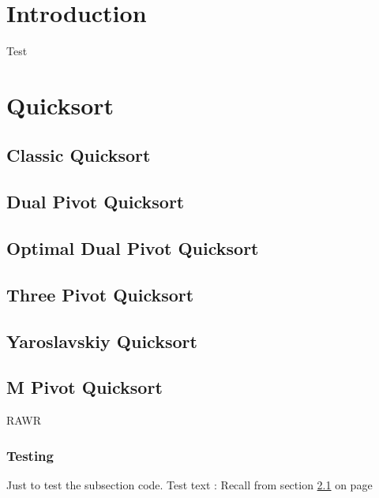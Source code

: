%

\section{Introduction}
	Test

\section{Quicksort}
		
	\subsection{Classic Quicksort}
		\label{subsec:ClassicQSortIntro}
	
	\subsection{Dual Pivot Quicksort}
		\label{subsec:DualPivotQSortIntro}
	
	\subsection{Optimal Dual Pivot Quicksort}	
		\label{subsec:OptimalDualPivotQSortIntro}
	
	\subsection{Three Pivot Quicksort}	
		\label{subsec:ThreePivotQSortIntro}
	
	\subsection{Yaroslavskiy Quicksort}	
		\label{subsec:YaroslavskiyQSortIntro}
	
	\subsection{M Pivot Quicksort}	
		\label{subsec:MPivotQSortIntro}
	
		RAWR
		\subsubsection{Testing}
			Just to test the subsection code.
			Test text : Recall from section \ref{subsec:ClassicQSortIntro} on page \pageref{subsec:ClassicQSortIntro}

